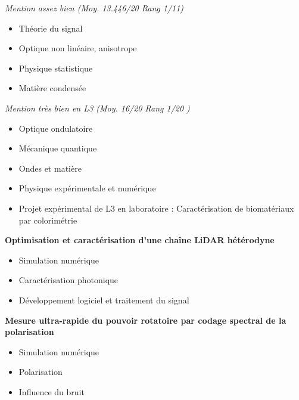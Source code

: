 \documentclass[9pt,a4paper,academicons]{altacv}
\begin{document}
\divider

\textit{Mention assez bien (Moy. 13.446/20 Rang 1/11)}\smallskip
\small{
\begin{itemize}
\item Théorie du signal
\item Optique non linéaire, anisotrope
\item Physique statistique
\item Matière condensée
\end{itemize}
}
\divider

\textit{Mention très bien en L3 (Moy. 16/20 Rang 1/20 )}\smallskip
\small{
\begin{itemize}
\item Optique ondulatoire
\item Mécanique quantique
\item Ondes et matière
\item Physique expérimentale et numérique
\item Projet expérimental de L3 en laboratoire : Caractérisation de biomatériaux par colorimétrie
\end{itemize}
}




\textbf{Optimisation et caractérisation d'une chaîne LiDAR hétérodyne}
\small{
\begin{itemize}
\item Simulation numérique
\item Caractérisation photonique
\item Développement logiciel et traitement du signal
\end{itemize}
}

\divider


\textbf{Mesure ultra-rapide du pouvoir rotatoire par codage spectral de la
polarisation}
\small{
\begin{itemize}
\item Simulation numérique
\item Polarisation
\item Influence du bruit
\end{itemize}
}
\end{document}
